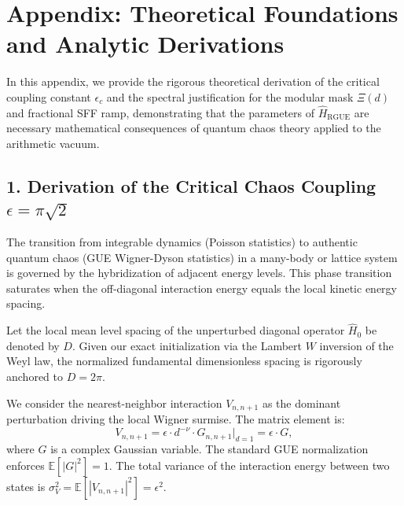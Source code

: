 \documentclass[aps,prl,preprint,superscriptaddress,floatfix]{revtex4-2}
\begin{document}
\appendix

\section{Appendix: Theoretical Foundations and Analytic Derivations}
\label{app:theory}

In this appendix, we provide the rigorous theoretical derivation of the critical coupling constant $\epsilon_c$ and the spectral justification for the modular mask $\Xi(d)$ and fractional SFF ramp, demonstrating that the parameters of $\hat{H}_{\text{RGUE}}$ are necessary mathematical consequences of quantum chaos theory applied to the arithmetic vacuum.

\subsection{1. Derivation of the Critical Chaos Coupling \texorpdfstring{$\epsilon = \pi\sqrt{2}$}{epsilon}}
The transition from integrable dynamics (Poisson statistics) to authentic quantum chaos (GUE Wigner-Dyson statistics) in a many-body or lattice system is governed by the hybridization of adjacent energy levels. This phase transition saturates when the off-diagonal interaction energy equals the local kinetic energy spacing.

Let the local mean level spacing of the unperturbed diagonal operator $\hat{H}_0$ be denoted by $D$. Given our exact initialization via the Lambert $W$ inversion of the Weyl law, the normalized fundamental dimensionless spacing is rigorously anchored to $D = 2\pi$.

We consider the nearest-neighbor interaction $V_{n, n+1}$ as the dominant perturbation driving the local Wigner surmise. The matrix element is:
\begin{equation}
V_{n, n+1} = \epsilon \cdot d^{-\nu} \cdot G_{n, n+1} \bigg|_{d=1} = \epsilon \cdot G,
\end{equation}
where $G$ is a complex Gaussian variable. The standard GUE normalization enforces $\mathbb{E}[|G|^2] = 1$. The total variance of the interaction energy between two states is $\sigma_V^2 = \mathbb{E}[|V_{n, n+1}|^2] = \epsilon^2$.
\end{document}
